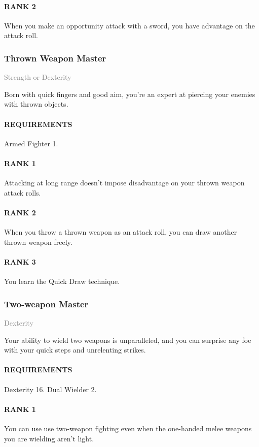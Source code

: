 \paragraph{RANK 2} When you make an opportunity attack with a sword, you have advantage on the attack roll.

\subsubsection{Thrown Weapon Master} \label{feat::thrownweaponmaster}
\small{\textcolor{gray}{Strength or Dexterity}}

\normalsize
Born with quick fingers and good aim, you're an expert at piercing your enemies with thrown objects.
\paragraph{REQUIREMENTS} Armed Fighter 1.
\paragraph{RANK 1} Attacking at long range doesn't impose disadvantage on your thrown weapon attack rolls.
\paragraph{RANK 2} When you throw a thrown weapon as an attack roll, you can draw another thrown weapon freely.
\paragraph{RANK 3} You learn the Quick Draw technique.

\subsubsection{Two-weapon Master} \label{feat::twoweaponmaster}
\small{\textcolor{gray}{Dexterity}}

\normalsize
Your ability to wield two weapons is unparalleled, and you can surprise any foe with your quick steps and unrelenting strikes.
\paragraph{REQUIREMENTS} Dexterity 16. Dual Wielder 2.
\paragraph{RANK 1} You can use use two-weapon fighting even when the one-handed melee weapons you are wielding aren't light.

